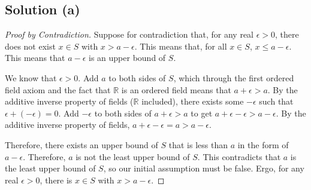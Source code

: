 \documentclass[11pt]{article}
\begin{document}
    \subsection{Solution (a)}
    \begin{proof}[Proof by Contradiction]
        Suppose for contradiction that, for any real $\epsilon > 0$, there does not exist $x \in S$ with $x > a - \epsilon$.
        This means that, for all $x \in S$, $x \leq a - \epsilon$.
        This means that $a - \epsilon$ is an upper bound of $S$.
        
        We know that $\epsilon > 0$.
        Add $a$ to both sides of $S$, which through the first ordered field axiom and the fact that $\mathbb{R}$ is an ordered field means that $a + \epsilon > a$.
        By the additive inverse property of fields ($\mathbb{R}$ included), there exists some $-\epsilon$ such that $\epsilon + (-\epsilon) = 0$.
        Add $-\epsilon$ to both sides of $a + \epsilon > a$ to get $a + \epsilon - \epsilon > a - \epsilon$.
        By the additive inverse property of fields, $a + \epsilon - \epsilon = a > a - \epsilon$.

        Therefore, there exists an upper bound of $S$ that is less than $a$ in the form of $a - \epsilon$.
        Therefore, $a$ is not the least upper bound of $S$.
        This contradicts that $a$ is the least upper bound of $S$, so our initial assumption must be false.
        Ergo, for any real $\epsilon > 0$, there is $x \in S$ with $x > a - \epsilon$.
    \end{proof}
\end{document}
